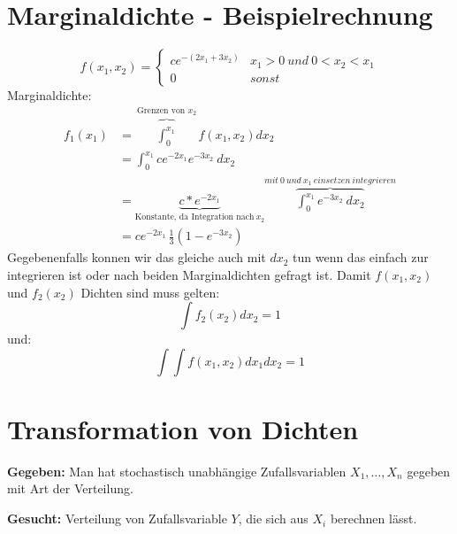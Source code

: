 \documentclass{article}
\begin{document}
\section{Marginaldichte - Beispielrechnung}
\[	
	f(x_1,x_2)=
	\begin{cases}
		ce^{-(2x_1+3x_2)} & x_1  > 0 \: und \: 0 < x_2 <x_1 \\
		0 & sonst
	\end{cases}
\]
Marginaldichte:
\[
	\begin{split}
		f_1(x_1) 	& = \overbrace{\int_{0}^{x_1}}^{\text{Grenzen von }x_2} f(x_1,x_2) dx_2 \\
							  & = \int_{0}^{x_1} ce^{-2x_1}e^{-3x_2} \: dx_2 \\
						   & = \underbrace{c*e^{-2x_1}}_{\text{Konstante, da Integration nach} \: x_2}
		\overbrace{\int_{0}^{x_1} e^{-3x_2} \: dx_2}^{mit \: 0 \: und \: x_1 \: einsetzen \: integrieren} \\
		& = ce^{-2x_1}\, \frac{1}{3} (1-e^{-3x_2} )
	\end{split}
\]
Gegebenenfalls konnen wir das gleiche auch mit $dx_2$ tun wenn das einfach zur integrieren ist oder nach beiden Marginaldichten gefragt ist.
Damit $f(x_1,x_2)$ und $f_2(x_2)$ Dichten sind muss gelten:
\[
	\int f_2(x_2) dx_2 = 1
\]
und:
\[
	\int \int f(x_1,x_2) dx_1 dx_2 = 1
\]
\section{Transformation von Dichten}
\begin{center}
\end{center}
\vspace*{7pt}
\textbf{Gegeben:} Man hat stochastisch unabhängige Zufallsvariablen $X_1, \ldots , X_n$ gegeben mit
Art der Verteilung.

\textbf{Gesucht:} Verteilung von Zufallsvariable $Y$, die sich aus $X_i$ berechnen lässt.
\end{document}
